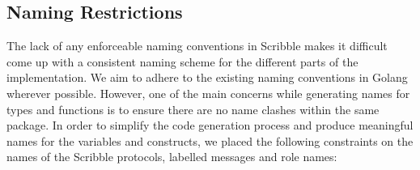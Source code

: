 \documentclass[12pt,twoside]{report}
\begin{document}
\subsection{Naming Restrictions}\label{naming-restrictions}

The lack of any enforceable naming conventions in Scribble makes it difficult come up with a consistent naming scheme for the different parts of the implementation. We aim to adhere to the existing naming conventions in Golang wherever possible. However, one of the main concerns while generating names for types and functions is to ensure there are no name clashes within the same package. In order to simplify the code generation process and produce meaningful names for the variables and constructs, we placed the following constraints on the names of the Scribble protocols, labelled messages and role names:
\end{document}

